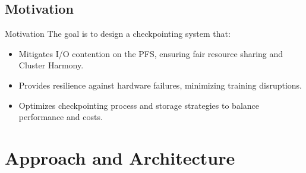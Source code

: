 \documentclass[handout]{beamer}
\begin{document}
\subsection{Motivation}
\begin{frame}{Motivation}
    \small
    The goal is to design a checkpointing system that:

    \centering
    \begin{itemize}
        \small
        \item Mitigates I/O contention on the PFS, ensuring fair resource sharing and Cluster Harmony.
        \item Provides resilience against hardware failures, minimizing training disruptions.
        \item Optimizes checkpointing process and storage strategies to balance performance and costs.
    \end{itemize}
\end{frame}

\section{Approach and Architecture}
\end{document}
